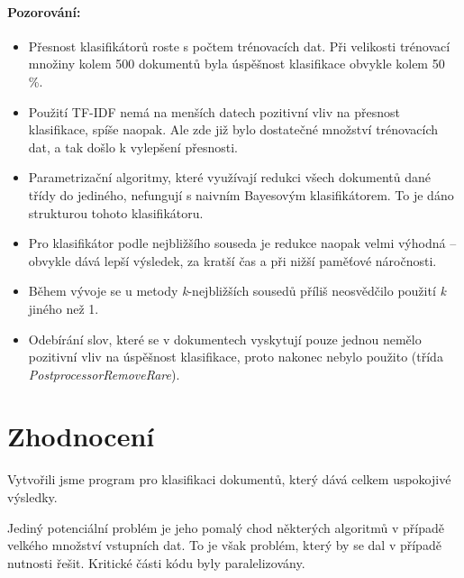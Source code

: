 \documentclass[12pt, a4paper]{report}
\begin{document}
\paragraph{Pozorování:}
\begin{itemize}
	\item Přesnost klasifikátorů roste s počtem trénovacích dat. Při velikosti trénovací množiny kolem 500 dokumentů byla úspěšnost klasifikace obvykle kolem 50 \%.
	\item Použití TF-IDF nemá na menších datech pozitivní vliv na přesnost klasifikace, spíše naopak. Ale zde již bylo dostatečné množství trénovacích dat, a tak došlo k vylepšení přesnosti.
	\item Parametrizační algoritmy, které využívají redukci všech dokumentů dané třídy do jediného, nefungují s naivním Bayesovým klasifikátorem. To je dáno strukturou tohoto klasifikátoru.
	\item Pro klasifikátor podle nejbližšího souseda je redukce naopak velmi výhodná -- obvykle dává lepší výsledek, za kratší čas a při nižší paměťové náročnosti.
	\item Během vývoje se u metody \emph{k}-nejbližších sousedů příliš neosvědčilo použití \emph{k} jiného než 1.
	\item Odebírání slov, které se v dokumentech vyskytují pouze jednou nemělo pozitivní vliv na úspěšnost klasifikace, proto nakonec nebylo použito (třída \emph{PostprocessorRemoveRare}).
\end{itemize}

\section{Zhodnocení}
Vytvořili jsme program pro klasifikaci dokumentů, který dává celkem uspokojivé výsledky.

Jediný potenciální problém je jeho pomalý chod některých algoritmů v případě velkého množství vstupních dat. To je však problém, který by se dal v případě nutnosti řešit. Kritické části kódu byly paralelizovány.




\end{document}
